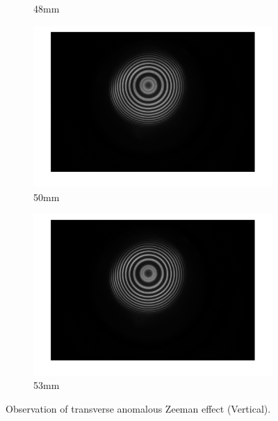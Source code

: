 \documentclass[a4paper,12pt]{article}
\begin{document}
\begin{figure}[H]
\begin{subfigure}[b]{0.3\textwidth}
        \caption{48mm}
      \end{subfigure}
    
      \vspace{0.5cm}
    
      \begin{subfigure}[b]{0.3\textwidth}
        \includegraphics[width=1.2\textwidth]{tra_ano_stripe_ver_50.png}
        \caption{50mm}
      \end{subfigure}
      \hfill
      \begin{subfigure}[b]{0.3\textwidth}
        \includegraphics[width=1.2\textwidth]{tra_ano_stripe_ver_53.png}
        \caption{53mm}
      \end{subfigure}
    
      \caption{Observation of transverse anomalous Zeeman effect (Vertical).}
      \label{fig:tra_ano_ver_fiveimages}
    \end{figure}
    
\end{document}

